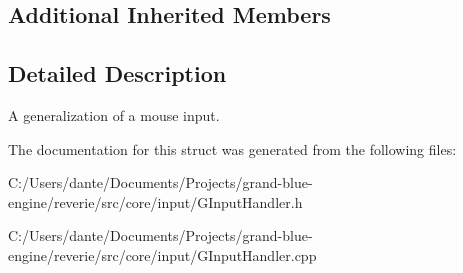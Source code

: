 \subsection*{Additional Inherited Members}


\subsection{Detailed Description}
A generalization of a mouse input. 

The documentation for this struct was generated from the following files\+:\begin{DoxyCompactItemize}
\item 
C\+:/\+Users/dante/\+Documents/\+Projects/grand-\/blue-\/engine/reverie/src/core/input/G\+Input\+Handler.\+h\item 
C\+:/\+Users/dante/\+Documents/\+Projects/grand-\/blue-\/engine/reverie/src/core/input/G\+Input\+Handler.\+cpp\end{DoxyCompactItemize}
